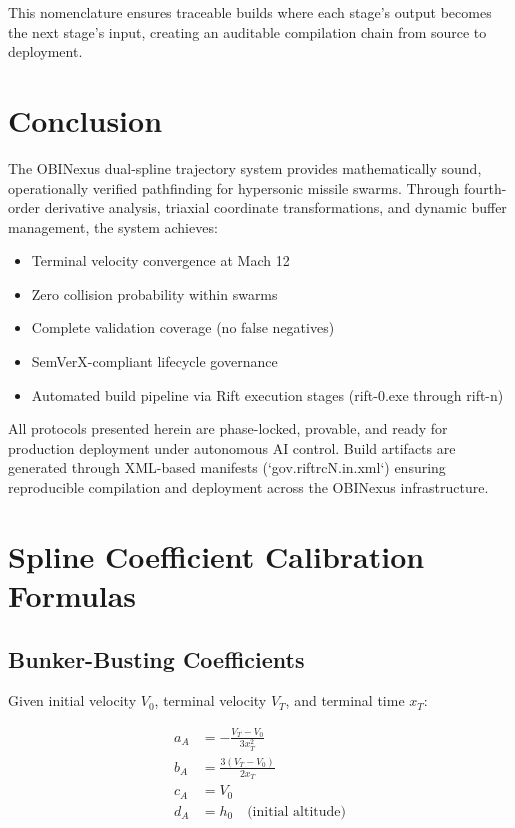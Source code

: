 \documentclass[11pt,a4paper]{article}
\theoremstyle{definition}
\theoremstyle{plain}
\begin{document}
This nomenclature ensures traceable builds where each stage's output becomes the next stage's input, creating an auditable compilation chain from source to deployment.

\section{Conclusion}

The OBINexus dual-spline trajectory system provides mathematically sound, operationally verified pathfinding for hypersonic missile swarms. Through fourth-order derivative analysis, triaxial coordinate transformations, and dynamic buffer management, the system achieves:

\begin{itemize}
    \item Terminal velocity convergence at Mach 12
    \item Zero collision probability within swarms
    \item Complete validation coverage (no false negatives)
    \item SemVerX-compliant lifecycle governance
    \item Automated build pipeline via Rift execution stages (rift-0.exe through rift-n)
\end{itemize}

All protocols presented herein are phase-locked, provable, and ready for production deployment under autonomous AI control. Build artifacts are generated through XML-based manifests (`gov.riftrc{N}.in.xml`) ensuring reproducible compilation and deployment across the OBINexus infrastructure.

\appendix

\section{Spline Coefficient Calibration Formulas}

\subsection{Bunker-Busting Coefficients}

Given initial velocity $V_0$, terminal velocity $V_T$, and terminal time $x_T$:

\begin{align}
a_A &= -\frac{V_T - V_0}{3x_T^2} \\
b_A &= \frac{3(V_T - V_0)}{2x_T} \\
c_A &= V_0 \\
d_A &= h_0 \quad \text{(initial altitude)}
\end{align}
\end{document}
